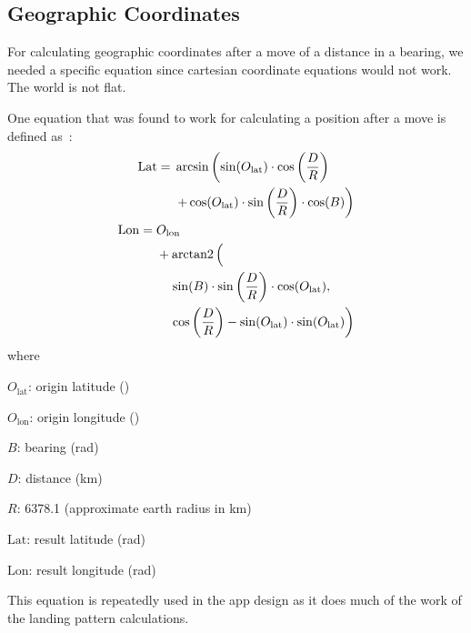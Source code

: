 \subsection{Geographic Coordinates}
For calculating geographic coordinates after a move of a distance in a bearing, we needed a specific equation since cartesian coordinate equations would not work. The world is not flat.

One equation that was found to work for calculating a position after a move is defined as~\cite{m_david_stackoverflow:_????}:
\begin{align}
  \begin{split}
    \mathrm{Lat} ={} &\arcsin\left(\sin(O_{\mathrm{lat}}) \cdot \cos\left(\frac{D}{R}\right) \right. \\
                     &\left.+ \cos(O_{\mathrm{lat}}) \cdot \sin\left(\frac{D}{R}\right) \cdot \cos(B)\right)
  \end{split}\label{eq:move-in-lat}\\
  \begin{split}
    \mathrm{Lon} ={} &O_{\mathrm{lon}} \\
                     & + \operatorname{arctan2}\left(\frac{}{}\right. \\
                     &\left.\quad\sin(B) \cdot \sin\left(\frac{D}{R}\right) \cdot \cos(O_{\mathrm{lat}}),\right. \\
                     &\left.\quad\cos\left(\frac{D}{R}\right) - \sin(O_{\mathrm{lat}}) \cdot \sin(O_{\mathrm{lat}})\right)
  \end{split}\label{eq:move-in-lon}
\end{align}
where
\begin{description}
  \item $O_{\mathrm{lat}}$: origin latitude (\si{\deg})
  \item $O_{\mathrm{lon}}$: origin longitude (\si{\deg})
  \item $B$: bearing (\si{\radian})
  \item $D$: distance (\si{\kilo\metre})
  \item $R$: 6378.1 (approximate earth radius in \si{\kilo\metre})
  \item $\mathrm{Lat}$: result latitude (\si{\radian})
  \item $\mathrm{Lon}$: result longitude (\si{\radian})
\end{description}

This equation is repeatedly used in the app design as it does much of the work of the landing pattern calculations.

